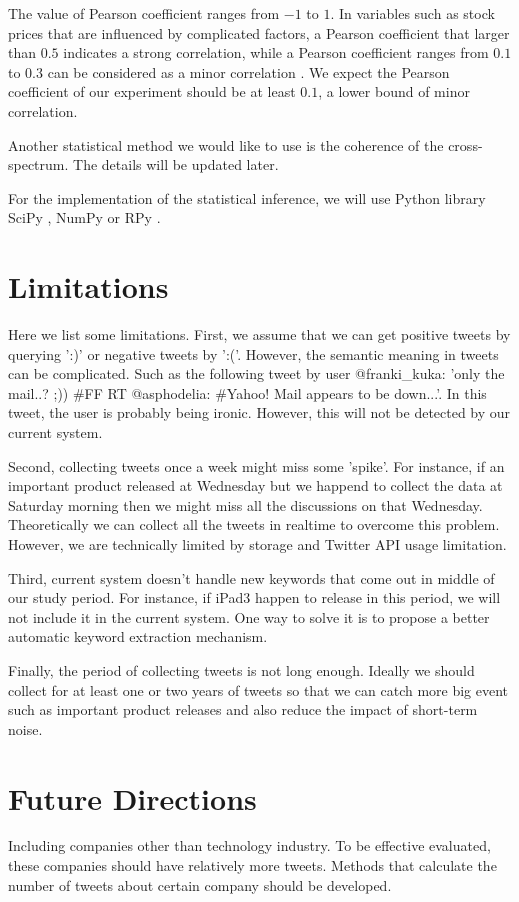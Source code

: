 \documentclass[12pt]{article}
\begin{document}
The value of Pearson coefficient ranges from $-1$ to $1$. In variables such as stock prices that are influenced by complicated factors, a Pearson coefficient that larger than $0.5$ indicates a strong correlation, while a Pearson coefficient ranges from $0.1$ to $0.3$ can be considered as a minor correlation \cite{Cohen:1988}. We expect the Pearson coefficient of our experiment should be at least $0.1$, a lower bound of minor correlation.

Another statistical method we would like to use is the coherence of the cross-spectrum. The details will be updated later.

For the implementation of the statistical inference, we will use Python library SciPy \cite{SciPy}, NumPy \cite{NumPy} or RPy \cite{RPy}.

\section{Limitations}
Here we list some limitations. First, we assume that we can get positive tweets by querying ':)' or negative tweets by ':('. However, the semantic meaning in tweets can be complicated. Such as the following tweet by user @franki\_kuka: 'only the mail..? ;)) \#FF RT @asphodelia: \#Yahoo! Mail appears to be down...'. In this tweet, the user is probably being ironic. However, this will not be detected by our current system.

Second, collecting tweets once a week might miss some 'spike'. For instance, if an important product released at Wednesday but we happend to collect the data at Saturday morning then we might miss all the discussions on that Wednesday. Theoretically we can collect all the tweets in realtime to overcome this problem. However, we are technically limited by storage and Twitter API usage limitation.

Third, current system doesn't handle new keywords that come out in middle of our study period. For instance, if iPad3 happen to release in this period, we will not include it in the current system. One way to solve it is to propose a better automatic keyword extraction mechanism.

Finally, the period of collecting tweets is not long enough. Ideally we should collect for at least one or two years of tweets so that we can catch more big event such as important product releases and also reduce the impact of short-term noise.

\section{Future Directions}

Including companies other than technology industry. To be effective evaluated, these companies should have relatively more tweets. Methods that calculate the number of tweets about certain company should be developed.



\end{document}
